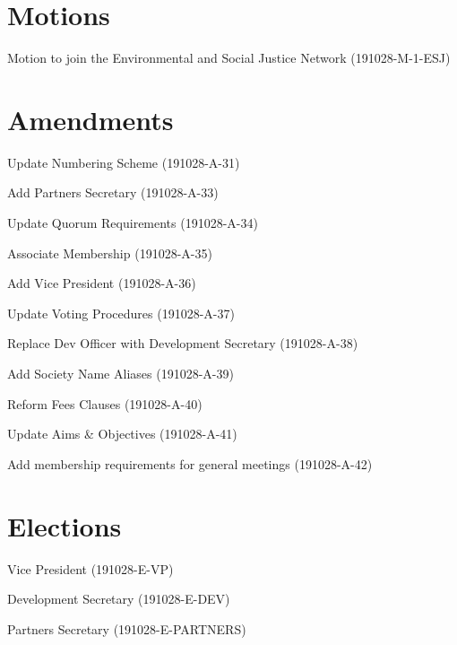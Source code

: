\documentclass[11pt,hacksoc, agenda]{meetingmins}
\begin{document}
\maketitle

\section{Motions}
\begin{items}
  \item Motion to join the Environmental and Social Justice Network (191028-M-1-ESJ)
\end{items}

\section{Amendments}
\begin{items}
  \item Update Numbering Scheme (191028-A-31)

  \item Add Partners Secretary (191028-A-33)

  \item Update Quorum Requirements (191028-A-34)

  \item Associate Membership (191028-A-35)

  \item Add Vice President (191028-A-36)

  \item Update Voting Procedures (191028-A-37)

  \item Replace Dev Officer with Development Secretary (191028-A-38)

  \item Add Society Name Aliases (191028-A-39)

  \item Reform Fees Clauses (191028-A-40)

  \item Update Aims \& Objectives (191028-A-41)

  \item Add membership requirements for general meetings (191028-A-42)
\end{items}

\section{Elections}
\begin{items}

  \item Vice President (191028-E-VP)

  \item Development Secretary (191028-E-DEV)

  \item Partners Secretary (191028-E-PARTNERS)
\end{items}
\end{document}
